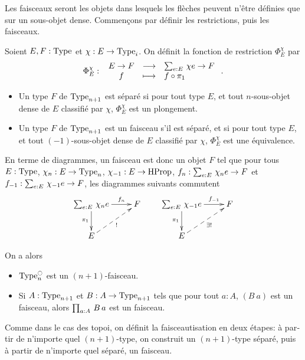 \begin{otherlanguage}{french}
Les faisceaux seront les objets dans lesquels les flèches peuvent
n'être définies que sur un sous-objet dense. Commençons par définir
les restrictions, puis les faisceaux.

\begin{defifr}
  Soient $E,F:\operatorname{Type}$ et $\chi:E\to\operatorname{Type}_i$. On définit la fonction de
  restriction $\Phi_E^\chi$ par
  \[
  \Phi_E^\chi \, \colon \left. \begin{array}{ccl} E\to F & \longrightarrow & \sum_{e:E}\, \chi e \to F \\ f & \longmapsto & f\circ \pi_1 \end{array} \right..
  \]
\end{defifr}
 
\begin{defifr}
  \begin{itemize}
  \item Un type $F$ de $\operatorname{Type}_{n+1}$ est séparé si pour tout type $E$,
    et tout $n$-sous-objet dense de $E$ classifié par $\chi$,
    $\Phi_E^\chi$ est un plongement.
  \item Un type $F$ de $\operatorname{Type}_{n+1}$ est un faisceau s'il est séparé, et si pour tout type $E$,
    et tout $(-1)$-sous-objet dense de $E$ classifié par $\chi$,
    $\Phi_E^\chi$ est une équivalence.
  \end{itemize}
\end{defifr}

En terme de diagrammes, un faisceau est donc un objet $F$ tel que pour
tous $E:\operatorname{Type}$, $\chi_n:E\to\operatorname{Type}_n$, $\chi_{-1}:E\to\operatorname{HProp}$, $f_n:
\sum_{e:E}\, \chi_n e \to F$ et $f_{-1}:
\sum_{e:E}\, \chi_{-1} e \to F$, les diagrammes suivants commutent
\[ \xymatrix{
  \sumD e E {\chi_n e} \ar[r]^-{f_n} \ar[d]_{\pi_1} & F \\
  E \ar@{-->}[ru]_{!}&
}
\qquad
\xymatrix{
  \sumD e E {\chi_{-1} e} \ar[r]^-{f_{-1}} \ar[d]_{\pi_1} & F \\
  E \ar@{-->}[ru]_{\exists !}&
}
\]

On a alors 
\begin{prop}
  \begin{itemize}
  \item $\operatorname{Type}_n^{\ocircle}$ est un $(n+1)$-faisceau.
  \item Si $A:\operatorname{Type}_{n+1}$ et $B:A \to \operatorname{Type}_{n+1}$ tels que pour tout
    $a:A$, $(B~a)$ est un faisceau, alors $\prod_{a:A}\, B\, a$ est un faisceau.
\end{itemize}
\end{prop}

Comme dans le cas des topoi, on définit la faisceautisation en deux
étapes: à partir de n'importe quel $(n+1)$-type, on construit un
$(n+1)$-type séparé, puis à partir de n'importe quel séparé, un
faisceau.


\end{otherlanguage}
